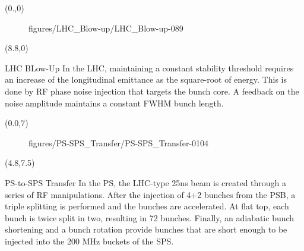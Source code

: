 \begin{frame}
		\begin{textblock}{8.8}(0.,0)
			\begin{figure}[h]
				 {figures/LHC_Blow-up/LHC_Blow-up-}{0}{89} %
			\end{figure}
		\end{textblock}
		\begin{textblock}{7.2}(8.8,0)
			\begin{block}{LHC BLow-Up}
				In the LHC, maintaining a constant stability threshold requires an increase of the longitudinal emittance as the square-root of energy. This is done by RF phase noise injection that targets the bunch core. 
				A feedback on the noise amplitude maintains a constant FWHM bunch length.
			\end{block}
		\end{textblock}
		\begin{textblock}{4.8}(0.0,7)
			\begin{figure}[h]
				 {figures/PS-SPS_Transfer/PS-SPS_Transfer-}{0}{104} %
			\end{figure}
		\end{textblock}
		\begin{textblock}{11.2}(4.8,7.5)
			\begin{block}{PS-to-SPS Transfer}
				In the PS, the LHC-type 25ns beam is created through a series of RF manipulations. After the injection of 4+2 bunches from the PSB, a triple splitting is performed and the bunches are accelerated. At flat top, each bunch is twice split in two, resulting in 72 bunches. Finally, an adiabatic bunch shortening and a bunch rotation provide bunches that are short enough to be injected into the 200 MHz buckets of the SPS.
			\end{block}
		\end{textblock}

\end{frame}


